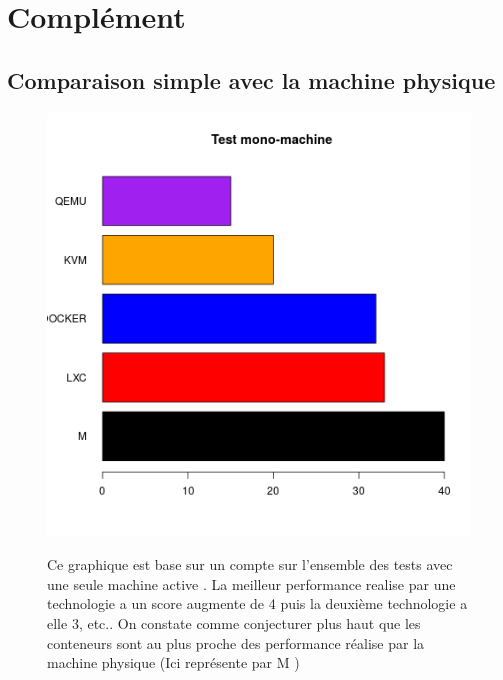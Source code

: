 \chapter{Complément}
\section{Comparaison simple avec la machine physique}
\begin{figure}[h]
   \begin{minipage}[c]{.46\linewidth}
	   \includegraphics[scale=0.55]{resultats/Monomachine.png}
   \end{minipage} \hfill
   \begin{minipage}[c]{.46\linewidth}
   	Ce graphique est base sur un compte sur l'ensemble des tests avec une seule machine active . La meilleur performance realise par une technologie a un score augmente de 4 puis la deuxième technologie a elle 3, etc.. On constate comme conjecturer plus haut que les conteneurs sont au plus proche des performance réalise par la machine physique (Ici représente par M )
   	 \end{minipage}
\end{figure}
